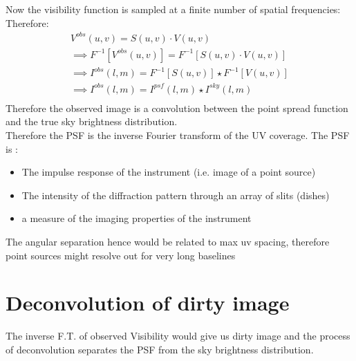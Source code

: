 \documentclass[10pt]{report}
\newcommand{\rr}[1]{\left[{#1}\right]}
\begin{document}
Now the visibility function is sampled at a finite number of spatial frequencies:\\

Therefore:
\begin{eqnarray*}
V^{obs}(u,v)=S(u,v)\cdot V(u,v)\\
\implies F^{-1}\rr{V^{obs}(u,v)}=F^{-1}\rr{S(u,v)\cdot V(u,v)}\\
\implies I^{obs}(l,m)=F^{-1}\rr{S(u,v)}\star F^{-1}\rr{ V(u,v)}\\
\implies I^{obs}(l,m)=I^{psf}(l,m)\star I^{sky}(l,m)\\
\end{eqnarray*}
Therefore the observed image is a convolution between the point spread function and the true sky brightness distribution.\\

Therefore the PSF is the inverse Fourier transform of the UV coverage. The PSF is :
\begin{itemize}
\item The impulse response of the instrument (i.e. image of a point source) \\
\item The intensity of the diffraction pattern through an array of slits (dishes)\\
\item a measure of the imaging properties of the instrument
\end{itemize}
The angular separation hence would be related to max uv spacing, therefore point sources might resolve out for very long baselines \\
\section{Deconvolution of dirty image}
The inverse F.T. of observed Visibility would give us dirty image and the process of deconvolution separates the PSF from the sky brightness distribution.
\end{document}
